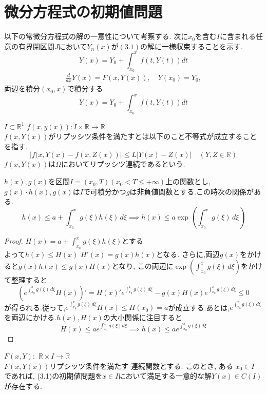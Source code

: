 \documentclass[12pt]{bxjsarticle}
\begin{document}
\section{微分方程式の初期値問題}
\label{sec:微分方程式の初期値問題}
   以下の常微分方程式の解の一意性について考察する.
       次に$x_{0}$を含む$I$に含まれる任意の有界閉区間$J$において$Y_{n}(x)$が$(3.1)$の解に一様収束することを示す.
       \[Y(x)=Y_{0}+\displaystyle \int_{x_{0}}^{x} f(t,Y(t)) dt\]
   \begin{align}
\frac{d}{dx}Y(x) = F(x, Y(x)), \quad Y(x_{0}) = Y_{0},
   \end{align}
   両辺を積分$(x_{0},x)$で積分する.
   \[Y(x)=Y_{0}+\displaystyle \int_{x_{0}}^{x} f(t,Y(t)) dt\]
\begin{Definition}[リプッシツ条件]
$I \subset \mathbb{R}^{1}$
$f(x,y(x)): I \times \mathbb{R} \to \mathbb{R}$\\
$f(x,Y(x))$がリプッシツ条件を満たすとは以下のこと不等式が成立することを指す.
\[
|f(x, Y(x) - f(x, Z(x))| \leq L |Y(x) - Z(x)| \quad (Y,Z \in \mathbb{R}) 
\]
$f(x,Y(x))$は$\Omega$においてリプッシツ連続であるという.
\end{Definition}
\begin{Lemma}[グロンウォールの不等式]
    $h(x),g(x)$を区間$I=(x_{0},T)(x_{0}<T\leq +\infty)$上の関数とし,$g(x)\cdot h(x),g(x)$は$I$で可積分かつ$g$は非負値関数とする.この時次の関係がある.
\[
h(x) \leq a + \int_{x_0}^x g(\xi) h(\xi) \, d\xi \implies 
h(x) \leq a \exp\left(\int_{x_0}^x g(\xi) \, d\xi\right)
\]
\end{Lemma}
\begin{proof}
    $H(x)=a+\displaystyle\int_{x_0}^x g(\xi) h(\xi)$とする\\
    よって$h(x)\leq H(x)$
    $H'(x)=g(x)h(x)$となる.
    さらに,両辺$g(x)$をかけると$g(x)h(x)\leq g(x)H(x)$となり, この両辺に$\exp\left(\int_{x_0}^x g(\xi) \, d\xi\right)$をかけて整理すると
    \[\left(e^{\int_{x_0}^x g(\xi) \, d\xi}H(x)\right)'=H(x)'e^{\int_{x_0}^x g(\xi) \, d\xi}-g(x)H(x)e^{\int_{x_0}^x g(\xi) \, d\xi} \leq 0\]
    が得られる.従って,$e^{\int_{x_0}^x g(\xi) \, d\xi}H(x) \leq H(x_{0})=a$が成立する.あとは,$e^{\int_{x_0}^x g(\xi) \, d\xi}$を両辺にかける.$h(x),H(x)$の大小関係に注目すると
    \[H(x) \leq ae^{\int_{x_{0}}^{x} g(\xi) d\xi} \implies h(x) \leq ae^{\int_{x_{0}}^{x} g(\xi) d\xi}\]
\end{proof}
\begin{Theorem}
        
$F(x, Y):$  $\mathbb{R}\times I \to \mathbb{R}$ \\
$F(x,Y(x))$リプシッツ条件を満たす 連続関数とする.
このとき, ある $x_0 \in I$ であれば, (3.1)の初期値問題を$x \in I$において満足する一意的な解$Y(x)\in C(I)$が存在する.
\end{Theorem}
\end{document}

